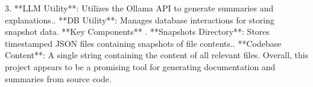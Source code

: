\documentclass{article}%
\begin{document}
3. **LLM Utility**: Utilizes the Ollama API to generate summaries and explanations.. **DB Utility**: Manages database interactions for storing snapshot data.\newline%
\newline%
**Key Components**\newline%
. **Snapshots Directory**: Stores timestamped JSON files containing snapshots of file contents.. **Codebase Content**: A single string containing the content of all relevant files.\newline%
\newline%
Overall, this project appears to be a promising tool for generating documentation and summaries from source code.

%
\end{document}
